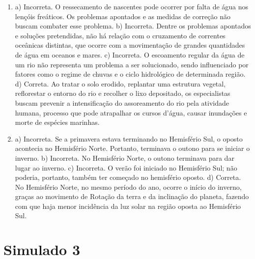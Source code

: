 \begin{enumerate}
\item
a) Incorreta. O ressecamento de nascentes pode ocorrer por falta de água
nos lençóis freáticos. Os problemas apontados e as medidas de correção
não buscam combater esse problema.
b) Incorreta. Dentre os problemas apontados e soluções pretendidas, não
há relação com o cruzamento de correntes oceânicas distintas, que ocorre
com a movimentação de grandes quantidades de água em oceanos e mares.
c) Incorreta. O escoamento regular da água de um rio não representa um
problema a ser solucionado, sendo influenciado por fatores como o regime
de chuvas e o ciclo hidrológico de determinada região.
d) Correta. Ao tratar o solo erodido, replantar uma estrutura vegetal,
reflorestar o entorno do rio e recolher o lixo depositado, os
especialistas buscam prevenir a intensificação do assoreamento do rio
pela atividade humana, processo que pode atrapalhar os cursos d'água,
causar inundações e morte de espécies marinhas.

\item
a) Incorreta. Se a primavera estava terminando no Hemisfério Sul, o
oposto acontecia no Hemisfério Norte. Portanto, terminava o outono para
se iniciar o inverno.
b) Incorreta. No Hemisfério Norte, o outono terminava para dar lugar ao
inverno.
c) Incorreta. O verão foi iniciado no Hemisfério Sul; não poderia, portanto, também ter começado no hemisfério oposto.
d) Correta. No Hemisfério Norte, no mesmo período do ano, ocorre o início
do inverno, graças ao movimento de Rotação da terra e da inclinação do
planeta, fazendo com que haja menor incidência da luz solar na região
oposta ao Hemisfério Sul.
\end{enumerate}

\section*{Simulado 3}

